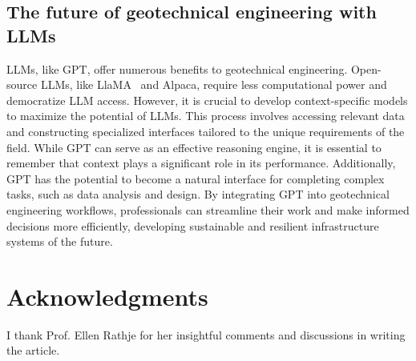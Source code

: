 \documentclass{article}
\begin{document}
\subsection{The future of geotechnical engineering with LLMs}
LLMs, like GPT, offer numerous benefits to geotechnical engineering. Open-source LLMs, like LlaMA~\parencite{touvron2023llama} and Alpaca, require less computational power and democratize LLM access. However, it is crucial to develop context-specific models to maximize the potential of LLMs. This process involves accessing relevant data and constructing specialized interfaces tailored to the unique requirements of the field. While GPT can serve as an effective reasoning engine, it is essential to remember that context plays a significant role in its performance. Additionally, GPT has the potential to become a natural interface for completing complex tasks, such as data analysis and design. By integrating GPT into geotechnical engineering workflows, professionals can streamline their work and make informed decisions more efficiently, developing sustainable and resilient infrastructure systems of the future.
\section*{Acknowledgments}
I thank Prof. Ellen Rathje for her insightful comments and discussions in writing the article. 
\clearpage
\printbibliography
\end{document}
